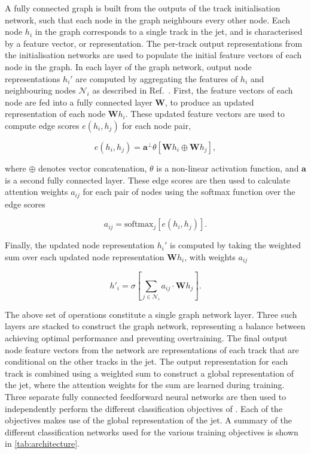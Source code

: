 A fully connected graph is built from the outputs of the track initialisation network, such that each node in the graph neighbours every other node.
Each node $h_i$ in the graph corresponds to a single track in the jet, and is characterised by a feature vector, or representation.
The per-track output representations from the initialisation networks are used to populate the initial feature vectors of each node in the graph.
In each layer of the graph network, output node representations $h_i'$ are computed by aggregating the features of $h_i$ and neighbouring nodes $\mathcal{N}_i$ as described in Ref.~\cite{2021arXiv210514491B}.
First, the feature vectors of each node are fed into a fully connected layer $\mathbf{W}$, to produce an updated representation of each node $\mathbf{W} h_i$.
These updated feature vectors are used to compute edge scores $e(h_i, h_j)$ for each node pair,

\begin{equation}\label{eq:edge_score}
    e(h_i, h_j) = \mathbf{a}^\perp \theta \left[ \mathbf{W}h_i \oplus \mathbf{W}h_j \right],
\end{equation}

where $\oplus$ denotes vector concatenation, $\theta$ is a non-linear activation function, and $\mathbf{a}$ is a second fully connected layer.
These edge scores are then used to calculate attention weights $a_{ij}$ for each pair of nodes using the softmax function over the edge scores

\begin{equation}\label{eq:attention weights}
    a_{ij} = \mathrm{softmax}_j \left[ e(h_i, h_j) \right].
\end{equation}

Finally, the updated node representation $h_i'$ is computed by taking the weighted sum over each updated node representation $\mathbf{W} h_i$, with weights $a_{ij}$

\begin{equation}\label{eq:updated_node_rep}
    h'_i = \sigma \left[ \sum_{j \in \mathcal{N}_i}{a_{ij} \cdot \mathbf{W} {h}_j}  \right].
\end{equation}

The above set of operations constitute a single graph network layer. 
Three such layers are stacked to construct the graph network, representing a balance between achieving optimal performance and preventing overtraining.
The final output node feature vectors from the network are representations of each track that are conditional on the other tracks in the jet.
The output representation for each track is combined using a weighted sum to construct a global representation of the jet, where the attention weights for the sum are learned during training.
Three separate fully connected feedforward neural networks are then used to independently perform the different classification objectives of \GNN.
Each of the objectives makes use of the global representation of the jet.
A summary of the different classification networks used for the various training objectives is shown in \cref{tab:architecture}.


